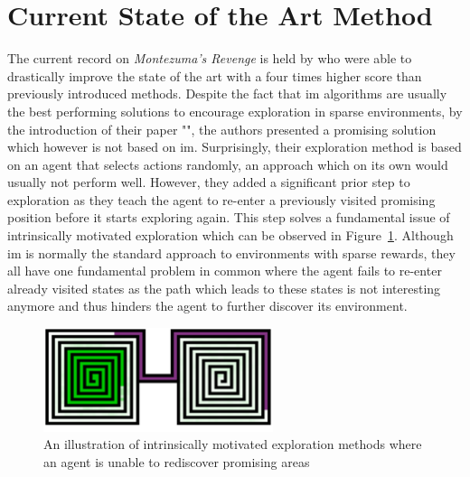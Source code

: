 \documentclass[draft,final]{vutinfth} %
\newcommand{\p}[1]{see p. #1}
\begin{document}
    \footnotetext{\citep[\p{2}]{pathak_self-supervised_2019}}


    \section{Current State of the Art Method}

    The current record on \textit{Montezuma's Revenge} is held by \citet{ecoffet_go-explore_2019} who were able to drastically improve the state of the art with a four times higher score than previously introduced methods.
    Despite the fact that \gls{im} algorithms are usually the best performing solutions to encourage exploration in sparse environments, by the introduction of their paper "", the authors presented a promising solution which however is not based on \gls{im}.
    Surprisingly, their exploration method is based on an agent that selects actions randomly, an approach which on its own would usually not perform well.
    However, they added a significant prior step to exploration as they teach the agent to re-enter a previously visited promising position before it starts exploring again.
    This step solves a fundamental issue of intrinsically motivated exploration which can be observed in Figure~\ref{fig:exploration_problem}.
    Although \gls{im} is normally the standard approach to environments with sparse rewards, they all have one fundamental problem in common where the agent fails to re-enter already visited states as the path which leads to these states is not interesting anymore and thus hinders the agent to further discover its environment.

    \begin{figure}[h]
        \centering
        \includegraphics[width=0.60\textwidth]{figures/exploration_problem.png}
        \caption[An illustration of intrinsically motivated exploration methods where an agent is unable to rediscover promising areas]{An illustration of intrinsically motivated exploration methods where an agent is unable to rediscover promising areas\protect\footnotemark}
        \label{fig:exploration_problem}
    \end{figure}
\end{document}
